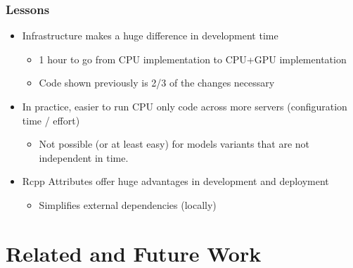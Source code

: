 \documentclass[t]{beamer}\usepackage[]{graphicx}\usepackage[]{color}
\begin{document}

\begin{frame}[label=pm_lessons]
\frametitle{Lessons}


\begin{itemize}
\item Infrastructure makes a huge difference in development time
\begin{itemize}
  \vspace{2mm} \item 1 hour to go from CPU implementation to CPU+GPU implementation 
  \vspace{2mm} \item Code shown previously is 2/3 of the changes necessary \hyperlink{code}{}
\end{itemize}

\vspace{2mm}
\item In practice, easier to run CPU only code across more servers (configuration time / effort)

\begin{itemize}
\vspace{2mm} \item Not possible (or at least easy) for models variants that are not independent in time.
\end{itemize}

\item Rcpp Attributes offer huge advantages in development and deployment
\begin{itemize}
  \item Simplifies external dependencies (locally)
\end{itemize}

\end{itemize}

\end{frame}


\section{Related and Future Work}

\end{document}
